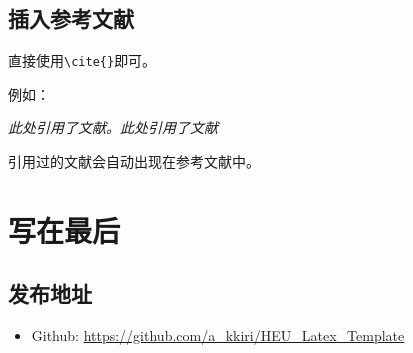 \documentclass[12pt,hyperref,a4paper,UTF8]{ctexart}
\begin{document}
%
%
%
%
%
%

\subsection{插入参考文献}
直接使用\verb|\cite{}|即可。

例如：


   \textit{ 此处引用了文献\cite{0Isaac}。此处引用了文献\cite{2016The}}


引用过的文献会自动出现在参考文献中。

\section{写在最后}
\subsection{发布地址}
\begin{itemize}
    \item Github: \url{https://github.com/a_kkiri/HEU_Latex_Template}
\end{itemize}

\newpage
{}
\end{document}
